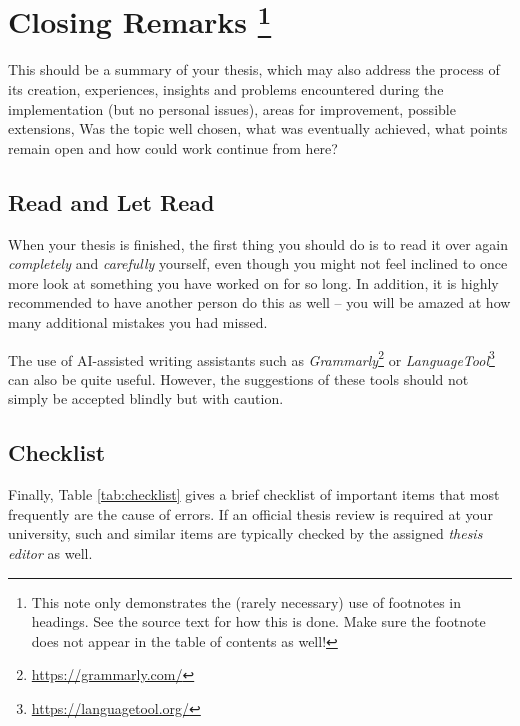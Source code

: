 \chapter[Closing Remarks]{Closing Remarks%
\protect\footnote{This note only demonstrates the (rarely necessary)
use of footnotes in headings. See the source text for how this is done.
Make sure the footnote does not appear in the table of contents as well!}}%
\label{cha:Closing}

This should be a summary of your thesis, which may also address the
process of its creation, experiences, insights and problems encountered during
the implementation (but no personal issues), areas for improvement, possible
extensions, \etc
Was the topic well chosen, what was eventually achieved,
what points remain open and how could work continue from here?


\section{Read and Let Read}

When your thesis is finished, the first thing you should do is to read it
over again \emph{completely} and \emph{carefully} yourself, even though you
might not feel inclined to once more look at something you have worked on for
so long. In addition, it is highly recommended to have another person do this
as well -- you will be amazed at how many additional mistakes you had missed.

The use of AI-assisted writing assistants such as
\emph{Grammarly}\footnote{\url{https://grammarly.com/}} or
\emph{LanguageTool}\footnote{\url{https://languagetool.org/}}
can also be quite useful. However, the suggestions of these tools should not
simply be accepted blindly but with caution.


\section{Checklist}

Finally, Table \ref{tab:checklist} gives a brief checklist of important items
that most frequently are the cause of errors. If an official thesis review is 
required at your university, such and similar items are typically checked 
by the assigned \emph{thesis editor} as well.


